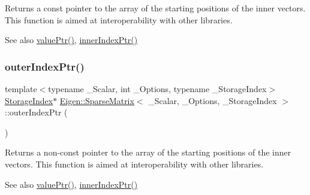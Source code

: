 \begin{DoxyReturn}{Returns}
a const pointer to the array of the starting positions of the inner vectors. This function is aimed at interoperability with other libraries. 
\end{DoxyReturn}
\begin{DoxySeeAlso}{See also}
\mbox{\hyperlink{class_eigen_1_1_sparse_matrix_ac2684952b14b5c9b0f68ae3bb8c517a6}{value\+Ptr()}}, \mbox{\hyperlink{class_eigen_1_1_sparse_matrix_a8e9ef5d399d36fdd860ad05cb7a31455}{inner\+Index\+Ptr()}} 
\end{DoxySeeAlso}
\mbox{\label{class_eigen_1_1_sparse_matrix_a9451af2795c1a5b97678272475e41422}} 
\subsubsection{\texorpdfstring{outerIndexPtr()}{outerIndexPtr()}\hspace{0.1cm}{\footnotesize\ttfamily [2/2]}}
{\footnotesize\ttfamily template$<$typename \+\_\+\+Scalar, int \+\_\+\+Options, typename \+\_\+\+Storage\+Index$>$ \\
\mbox{\hyperlink{class_eigen_1_1_sparse_matrix_base_a0b540ba724726ebe953f8c0df06081ed}{Storage\+Index}}$\ast$ \mbox{\hyperlink{class_eigen_1_1_sparse_matrix}{Eigen\+::\+Sparse\+Matrix}}$<$ \+\_\+\+Scalar, \+\_\+\+Options, \+\_\+\+Storage\+Index $>$\+::outer\+Index\+Ptr (\begin{DoxyParamCaption}{ }\end{DoxyParamCaption})\hspace{0.3cm}{\ttfamily [inline]}}

\begin{DoxyReturn}{Returns}
a non-\/const pointer to the array of the starting positions of the inner vectors. This function is aimed at interoperability with other libraries. 
\end{DoxyReturn}
\begin{DoxySeeAlso}{See also}
\mbox{\hyperlink{class_eigen_1_1_sparse_matrix_ac2684952b14b5c9b0f68ae3bb8c517a6}{value\+Ptr()}}, \mbox{\hyperlink{class_eigen_1_1_sparse_matrix_a8e9ef5d399d36fdd860ad05cb7a31455}{inner\+Index\+Ptr()}} 
\end{DoxySeeAlso}
\mbox{\label{class_eigen_1_1_sparse_matrix_a4e5f706cfae14d2eaec1ea1e234905f1}} 
